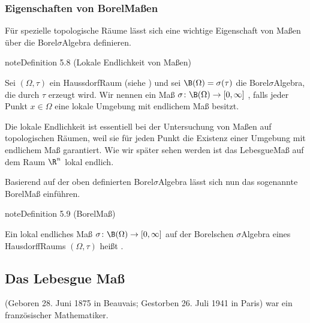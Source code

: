 \documentclass[letterpaper,10pt,german]{jupyterBook}
\begin{document}
\subsubsection{Eigenschaften von Borel\sphinxhyphen{}Maßen}
\label{\detokenize{masstheorie/masstheorie:eigenschaften-von-borel-maszen}}
\sphinxAtStartPar
Für spezielle topologische Räume lässt sich eine wichtige Eigenschaft von Maßen über die Borel\sphinxhyphen{}\(\sigma\)\sphinxhyphen{}Algebra definieren.
\label{masstheorie/masstheorie:definition-14}
\begin{sphinxadmonition}{note}{Definition 5.8 (Lokale Endlichkeit von Maßen)}



\sphinxAtStartPar
Sei \((\Omega, \tau)\) ein Haussdorf\sphinxhyphen{}Raum (siehe {\hyperref[\detokenize{manifolds/manifolds_prelim:def:hausdorffraum}]{}}) und sei \(\B(\Omega) = \sigma(\tau)\) die Borel\sphinxhyphen{}\(\sigma\)\sphinxhyphen{}Algebra, die durch \(\tau\) erzeugt wird.
Wir nennen ein Maß \(\sigma \colon \B(\Omega) \rightarrow [0, \infty]\) , falls jeder Punkt \(x \in \Omega\) eine lokale Umgebung mit endlichem Maß besitzt.
\end{sphinxadmonition}

\sphinxAtStartPar
Die lokale Endlichkeit ist essentiell bei der Untersuchung von Maßen auf topologischen Räumen, weil sie für jeden Punkt die Existenz einer Umgebung mit endlichem Maß garantiert.
Wie wir später sehen werden ist das Lebesgue\sphinxhyphen{}Maß auf dem Raum \(\R^n\) lokal endlich.

\sphinxAtStartPar
Basierend auf der oben definierten Borel\sphinxhyphen{}\(\sigma\)\sphinxhyphen{}Algebra lässt sich nun das sogenannte Borel\sphinxhyphen{}Maß einführen.
\label{masstheorie/masstheorie:definition-15}
\begin{sphinxadmonition}{note}{Definition 5.9 (Borel\sphinxhyphen{}Maß)}



\sphinxAtStartPar
Ein lokal endliches Maß \(\sigma \colon \B(\Omega) \rightarrow [0, \infty]\) auf der Borelschen \(\sigma\)\sphinxhyphen{}Algebra eines Hausdorff\sphinxhyphen{}Raums \((\Omega,\tau)\) heißt .
\end{sphinxadmonition}


\subsection{Das Lebesgue Maß}
\label{\detokenize{masstheorie/masstheorie:das-lebesgue-masz}}\label{\detokenize{masstheorie/masstheorie:s-lebesguemeasure}}
\begin{sphinxShadowBox}

\sphinxAtStartPar
{} (Geboren 28. Juni 1875 in Beauvais; Gestorben 26. Juli 1941 in Paris) war ein französischer Mathematiker.
\end{sphinxShadowBox}
\end{document}
